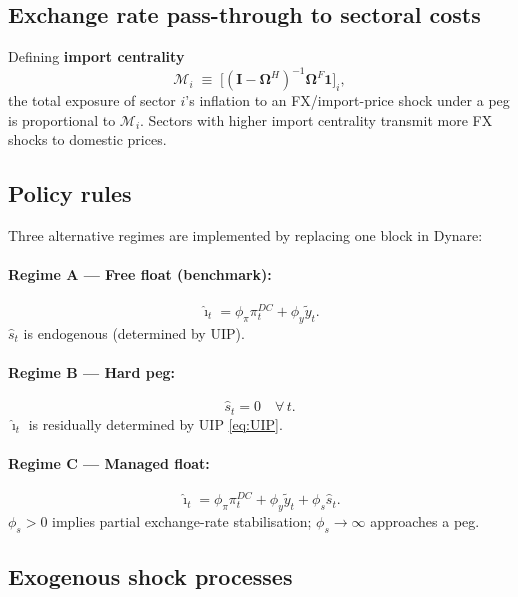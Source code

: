 \documentclass[11pt,a4paper]{article}
\newcommand{\OmH}{\bm\Omega^{H}}
\newcommand{\OmF}{\bm\Omega^{F}}
\newcommand{\wh}[1]{\widehat{#1}}
\providecommand{\tl}[1]{\widetilde{#1}}
\newcommand{\DC}{\pi^{DC}}
\begin{document}
\subsection{Exchange rate pass-through to sectoral costs}

Defining \textbf{import centrality}
\begin{equation}
\mathcal{M}_i\;\equiv\;\bigl[(\mathbf{I}-\OmH)^{-1}\OmF\mathbf{1}\bigr]_i,
\label{eq:importcent}
\end{equation}
the total exposure of sector $i$'s inflation to an FX/import-price shock
under a peg is proportional to $\mathcal{M}_i$.  Sectors with higher import
centrality transmit more FX shocks to domestic prices.

\subsection{Policy rules}
\label{sec:policy}

Three alternative regimes are implemented by replacing one block in Dynare:

\paragraph{Regime A — Free float (benchmark):}
\begin{equation}
\wh\imath_t=\phi_\pi\DC_t+\phi_y\tl y_t.
\label{eq:Taylor_float}
\end{equation}
$\wh s_t$ is endogenous (determined by UIP).

\paragraph{Regime B — Hard peg:}
\begin{equation}
\wh s_t=0\quad\forall\,t.
\label{eq:peg}
\end{equation}
$\wh\imath_t$ is residually determined by UIP \eqref{eq:UIP}.

\paragraph{Regime C — Managed float:}
\begin{equation}
\wh\imath_t=\phi_\pi\DC_t+\phi_y\tl y_t+\phi_s\wh s_t.
\label{eq:Taylor_managed}
\end{equation}
$\phi_s>0$ implies partial exchange-rate stabilisation; $\phi_s\to\infty$
approaches a peg.

\subsection{Exogenous shock processes}
\end{document}
